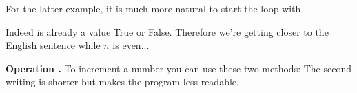 \documentclass[11pt,class=report,crop=false]{standalone}
\begin{document}
\begin{cours}
\begin{exemple}
For the latter example, it is much more natural to start the loop with

Indeed  is already a value \og{}True\fg{} or \og{}False\fg{}.
Therefore we're getting closer to the English sentence \og{}while $n$ is even...\fg{}

\end{exemple}


\textbf{Operation \og{}\ci{+=}\fg{}.}
To increment a number you can use these two methods:
The second writing is shorter but makes the program less readable.
\end{cours}



\end{document}
